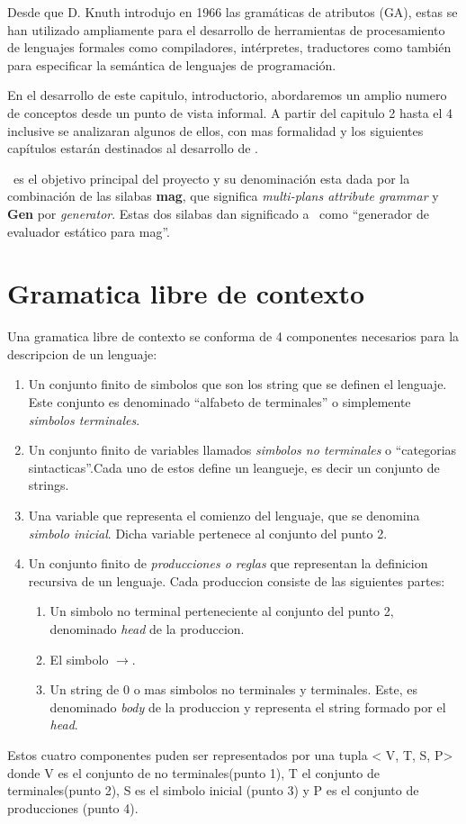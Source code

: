 Desde que D. Knuth introdujo en 1966 las gramáticas de atributos (GA), estas se han utilizado ampliamente para el desarrollo de herramientas de procesamiento de lenguajes formales como compiladores, intérpretes, traductores como también para especificar la semántica de lenguajes de programación.

En el desarrollo de este capitulo, introductorio, abordaremos un amplio numero de conceptos desde un punto de vista informal. A partir del capitulo 2 hasta el 4 inclusive se analizaran algunos de ellos, con mas formalidad y los siguientes capítulos estarán destinados al desarrollo de \maggen. 

\maggen\ es el objetivo principal del proyecto y su denominación esta dada por la combinación de las silabas \textbf{mag}, que significa \textit{multi-plans attribute grammar} y \textbf{Gen} por \textit{generator}. Estas dos silabas dan significado a \maggen\ como ``generador de evaluador estático para mag''.


\section{Gramatica libre de contexto}
Una gramatica libre de contexto se conforma de 4 componentes necesarios para la descripcion de un lenguaje:
\begin{enumerate}
\item Un conjunto finito de simbolos que son los string que se definen el lenguaje. Este conjunto es denominado ``alfabeto de terminales'' o simplemente \textit{simbolos terminales}.
\item Un conjunto finito de variables llamados \textit{simbolos no terminales} o ``categorias sintacticas''.Cada uno de estos define un leangueje, es decir un conjunto de strings.
\item Una variable que representa el comienzo del lenguaje, que se denomina \textit{simbolo inicial}. Dicha variable pertenece al conjunto del punto 2.
\item Un conjunto finito de \textit{producciones o reglas} que representan la definicion recursiva de un lenguaje. Cada produccion consiste de las siguientes partes:
\begin{enumerate}
\item Un simbolo no terminal perteneciente al conjunto del punto 2, denominado \textit{head} de la produccion.
\item El simbolo $\rightarrow$.
\item Un string de 0  o mas simbolos no terminales y terminales. Este, es denominado \textit{body} de la produccion y representa el string formado por el \textit{head}.
\end{enumerate}
\end{enumerate}
Estos cuatro componentes puden ser representados por una tupla < V, T, S, P> donde V es el conjunto de no terminales(punto 1), T el conjunto de terminales(punto 2), S es el simbolo inicial (punto 3) y P es el conjunto de producciones (punto 4).

